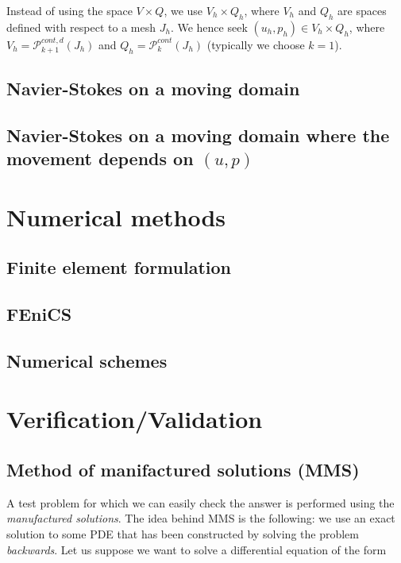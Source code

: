 \documentclass[11pt,a4paper,titlepage]{report}
\begin{document}
Instead of using the space $V \times Q$, we use $V_h \times Q_h$, where $V_h$ and $Q_h$ are spaces defined with respect to a mesh $J_h$. We hence seek $(u_h, p_h) \in V_h \times Q_h$, where $V_h = \mathcal{P}^{cont,d}_{k+1} (J_h)$ and $Q_h = \mathcal{P}^{cont}_{k} (J_h)$ (typically we choose $k=1$). \\

\section{Navier-Stokes on a moving domain}

\section{Navier-Stokes on a moving domain where the movement depends on $(u,p)$}

\chapter{Numerical methods}

\section{Finite element formulation}
\section{FEniCS}
\section{Numerical schemes}

\chapter{Verification/Validation}

\section{Method of manifactured solutions (MMS)}

A test problem for which we can easily check the answer is performed using the \textit{manufactured solutions}. The idea behind MMS is the following: we use an exact solution to some PDE that has been constructed by solving the problem \textit{backwards}. Let us suppose we want to solve a differential equation of the form 
\end{document}
